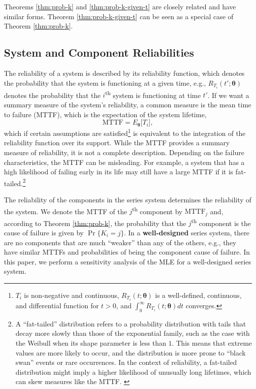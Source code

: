 \documentclass[
]{article}
\theoremstyle{definition}
\theoremstyle{plain}
\theoremstyle{definition}
\theoremstyle{definition}
\theoremstyle{definition}
\theoremstyle{definition}
\theoremstyle{remark}
\begin{document}
Theorems \ref{thm:prob-k} and \ref{thm:prob-k-given-t} are closely related
and have similar forms. Theorem \ref{thm:prob-k-given-t} can be seen as a
special case of Theorem \ref{thm:prob-k}.

\hypertarget{reliability}{%
\subsection{System and Component Reliabilities}\label{reliability}}

The reliability of a system is described by its reliability function, which
denotes the probability that the system is functioning at a given time,
e.g., \(R_{T_i}(t';\boldsymbol{\theta})\) denotes the probability that the \(i\)\textsuperscript{th}
system is functioning at time \(t'\). If we want a summary measure of the system's
reliability, a common measure is the mean time to failure (MTTF), which is the
expectation of the system lifetime,
\begin{equation}
\label{mttf-sys}
\text{MTTF} = E_{\boldsymbol{\theta}}\!\bigl[T_i\bigr],
\end{equation}
which if certain assumptions are satisfied\footnote{\(T_i\) is non-negative and continuous, \(R_{T_i}(t;\boldsymbol{\theta})\) is a well-defined,
  continuous, and differential function for \(t > 0\), and \(\int_0^\infty R_{T_i}(t;\boldsymbol{\theta}) dt\)
  converges.} is equivalent to the integration
of the reliability function over its support. While the MTTF provides a summary
measure of reliability, it is not a complete description. Depending on the
failure characteristics, the MTTF can be misleading. For example, a system that has
a high likelihood of failing early in its life may still have a large MTTF if it
is fat-tailed.\footnote{A ``fat-tailed'' distribution refers to a probability distribution with tails that
  decay more slowly than those of the exponential family, such as the case with the Weibull
  when its shape parameter is less than \(1\). This means that extreme values are more
  likely to occur, and the distribution is more prone to ``black swan'' events or rare occurrences.
  In the context of reliability, a fat-tailed distribution might imply a higher likelihood of
  unusually long lifetimes, which can skew measures like the MTTF. \citep{taleb2007black}}

The reliability of the components in the series system determines the reliability
of the system. We denote the MTTF of the \(j\)\textsuperscript{th} component by
\(\text{MTTF}_j\) and, according to Theorem \ref{thm:prob-k}, the probability
that the \(j\)\textsuperscript{th} component is the cause of failure is given by
\(\Pr\{K_i = j\}\). In a \textbf{well-designed} series system, there are no components
that are much ``weaker'' than any of the others, e.g., they have similar
MTTFs and probabilities of being the component cause of failure. In this paper,
we perform a sensitivity analysis of the MLE for a well-designed series system.
\end{document}
